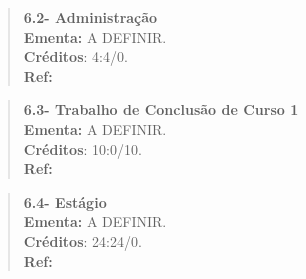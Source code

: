 \begin{comment}
\textbf{6.3- Ética na Computação }
\begin{center}
\begin{tabular}{|p{4.5cm}|p{10.0cm}|} \hline
Título & Ética na Computação \\ \hline
Objetivo & Tornar o aluno um profissional ético, com capacidade de atuar de maneira ética nos diversos setores da computação. Desenvolver no aluno a competência para distinguir as falhas éticas e evitá-las em sua vida profissional. \\ \hline
Pré-requisitos & não há \\ \hline
Disciplinas recomendadas & não há \\ \hline
Ementa & 1. Contextualização (o que é ética); 2. Princípios éticos na computação; 3. Códigos de ética na computação; 4. Casos reais de faltas éticas e suas consequências; 5. Legislação correspondente; 6. Diretrizes para uma conduta ética acadêmica e profissional na computação; 7. Elaboração de trabalhos práticos relacionados ao tema.  \\ \hline
Créditos & 4 (2t,2p) \\ \hline
Carga extra-classe & 2 horas\\ \hline
Responsável pela oferta & DC \\ \hline
\end{tabular}
\end{center}
\end{comment}

\begin{quote}
\textbf{6.2- Administração }
\\  
\textbf{Ementa:} A DEFINIR.
\\
\textbf{Créditos}: 4:4/0.
\\
\textbf{Ref:}
\end{quote}



\begin{quote}
\textbf{6.3- Trabalho de Conclusão de Curso 1}
\\  
\textbf{Ementa:} A DEFINIR.
\\
\textbf{Créditos}: 10:0/10.
\\
\textbf{Ref:}
\end{quote}




\begin{quote}
\textbf{6.4- Estágio}
\\  
\textbf{Ementa:} A DEFINIR.
\\
\textbf{Créditos}: 24:24/0.
\\
\textbf{Ref:}
\end{quote}



